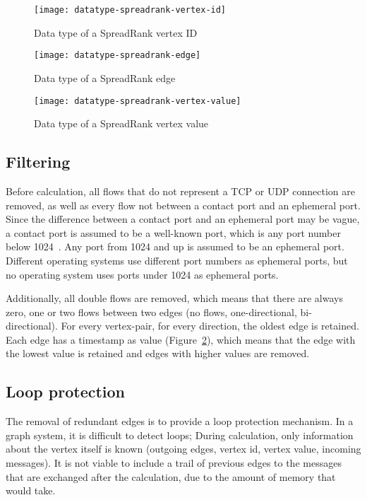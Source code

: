 \begin{figure}[h!]
	\caption{Data type of a SpreadRank vertex ID}
	\label{fig:datatype-spreadrank-vertex-id}
	\centering
		\texttt{[image: datatype-spreadrank-vertex-id]}
\end{figure}
\begin{figure}[h!]
	\caption{Data type of a SpreadRank edge}
	\label{fig:datatype-spreadrank-edge}
	\centering
		\texttt{[image: datatype-spreadrank-edge]}
\end{figure}
\begin{figure}[h!]
	\caption{Data type of a SpreadRank vertex value}
	\label{fig:datatype-spreadrank-vertex-value}
	\centering
		\texttt{[image: datatype-spreadrank-vertex-value]}
\end{figure}


\subsection{Filtering}
\label{sec:filtering}
Before calculation, all flows that do not represent a TCP or UDP connection are removed,
 as well as every flow not between a \gls{contact port} and an \gls{ephemeral port}.
Since the difference between a \gls{contact port} and an \gls{ephemeral port} may be vague,
 a \gls{contact port} is assumed to be a \gls{well-known port}, which is any port number below 1024~\cite{rfc1700}.
Any port from 1024 and up is assumed to be an \gls{ephemeral port}.
Different operating systems use different port numbers as \gls{ephemeral port}s,
 but no operating system uses ports under 1024 as \gls{ephemeral port}s.

Additionally, all double flows are removed, which means that there are always zero, one or two flows between two edges (no flows, one-directional, bi-directional).
For every vertex-pair, for every direction, the oldest edge is retained.
Each edge has a timestamp as value (Figure~\ref{fig:datatype-spreadrank-edge}), which means that the edge with the lowest value is retained and edges with higher values are removed.


\subsection{Loop protection}
The removal of redundant edges is to provide a loop protection mechanism.
In a graph system, it is difficult to detect loops;
During calculation, only information about the vertex itself is known (outgoing edges, vertex id, vertex value, incoming messages).
It is not viable to include a trail of previous edges to the messages that are exchanged after the calculation,
 due to the amount of memory that would take.

